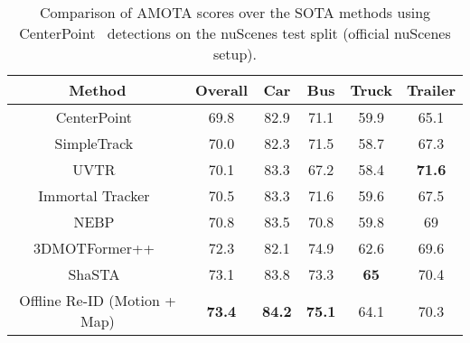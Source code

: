 \documentclass{article} \usepackage{iclr2023_conference,times}
\begin{document}
\begin{table*}[t]\vspace{-6mm}
    \centering
    \begin{tabular}{c|c|cccc}
    \textbf{Method}              & \textbf{Overall} & \textbf{Car}  & \textbf{Bus}  & \textbf{Truck} & \textbf{Trailer} \\ \hline
    CenterPoint~\cite{Centerpoint}                  & 69.8            & 82.9          & 71.1          & 59.9           & 65.1             \\
    SimpleTrack~\cite{SimpleTrack}                   & 70.0             & 82.3          & 71.5          & 58.7           & 67.3            \\
    UVTR~\cite{UVTR}                   & 70.1             & 83.3          & 67.2          & 58.4           & \textbf{71.6}             \\
    Immortal Tracker~\cite{Immortaltrackers}                   & 70.5             & 83.3          & 71.6          & 59.6           & 67.5             \\
    NEBP~\cite{NEBP}                         & 70.8           & 83.5          & 70.8          & 59.8           & 69               \\
    3DMOTFormer++~\cite{3DMOTFormer}             & 72.3             & 82.1          & 74.9          & 62.6           & 69.6             \\
    ShaSTA~\cite{ShaSTA}                       & 73.1           & 83.8          & 73.3          & \textbf{65}    & 70.4
    \\ \hline
    Offline Re-ID (Motion + Map) & \textbf{73.4}  & \textbf{84.2} & \textbf{75.1} & 64.1           & 70.3            
    \end{tabular}
    \caption{Comparison of AMOTA scores over the SOTA methods using CenterPoint~\cite{Centerpoint} detections on the nuScenes test split (official nuScenes setup). }
    \label{tab: Re-ID AMOTA test }
\end{table*}
\end{document}
